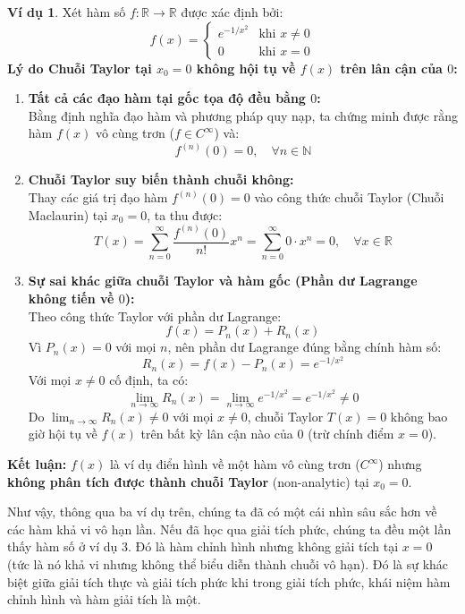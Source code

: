 \documentclass[12pt]{article}
\theoremstyle{definition}
\newtheorem*{example}{Ví dụ}
\theoremstyle{remark}
\begin{document}
\begin{example}
    Xét hàm số $f: \mathbb{R} \to \mathbb{R}$ được xác định bởi:
$$f(x) = \begin{cases} 
e^{-1/x^2} & \text{khi } x \neq 0 \\ 
0 & \text{khi } x = 0 
\end{cases}$$
\textbf{Lý do Chuỗi Taylor tại $x_0 = 0$ không hội tụ về $f(x)$ trên lân cận của $0$:}

\begin{enumerate}
    \item \textbf{Tất cả các đạo hàm tại gốc tọa độ đều bằng $0$:} \\
    Bằng định nghĩa đạo hàm và phương pháp quy nạp, ta chứng minh được rằng hàm $f(x)$ vô cùng trơn ($f \in C^\infty$) và:
    $$f^{(n)}(0) = 0, \quad \forall n \in \mathbb{N}$$
    
    \item \textbf{Chuỗi Taylor suy biến thành chuỗi không:} \\
    Thay các giá trị đạo hàm $f^{(n)}(0) = 0$ vào công thức chuỗi Taylor (Chuỗi Maclaurin) tại $x_0 = 0$, ta thu được:
    $$T(x) = \sum_{n=0}^{\infty} \frac{f^{(n)}(0)}{n!} x^n = \sum_{n=0}^{\infty} 0 \cdot x^n = 0, \quad \forall x \in \mathbb{R}$$
    
    \item \textbf{Sự sai khác giữa chuỗi Taylor và hàm gốc (Phần dư Lagrange không tiến về $0$):} \\
    Theo công thức Taylor với phần dư Lagrange:
    $$f(x) = P_n(x) + R_n(x)$$
    Vì $P_n(x) = 0$ với mọi $n$, nên phần dư Lagrange đúng bằng chính hàm số:
    $$R_n(x) = f(x) - P_n(x) = e^{-1/x^2}$$
    Với mọi $x \neq 0$ cố định, ta có:
    $$\lim_{n \to \infty} R_n(x) = \lim_{n \to \infty} e^{-1/x^2} = e^{-1/x^2} \neq 0$$
    Do $\lim_{n \to \infty} R_n(x) \neq 0$ với mọi $x \neq 0$, chuỗi Taylor $T(x) = 0$ không bao giờ hội tụ về $f(x)$ trên bất kỳ lân cận nào của $0$ (trừ chính điểm $x = 0$).
\end{enumerate}

\textbf{Kết luận:} $f(x)$ là ví dụ điển hình về một hàm vô cùng trơn ($C^\infty$) nhưng \textbf{không phân tích được thành chuỗi Taylor} (non-analytic) tại $x_0 = 0$.
\end{example}
Như vậy, thông qua ba ví dụ trên, chúng ta đã có một cái nhìn sâu sắc hơn về các hàm khả vi vô hạn lần. Nếu đã học qua giải tích phức, chúng ta đều một lần thấy hàm số ở ví dụ 3. Đó là hàm chỉnh hình nhưng không giải tích tại $x=0$ (tức là nó khả vi nhưng không thể biểu diễn thành chuỗi vô hạn). Đó là sự khác biệt giữa giải tích thực và giải tích phức khi trong giải tích phức, khái niệm hàm chỉnh hình và hàm giải tích là một.
\end{document}
